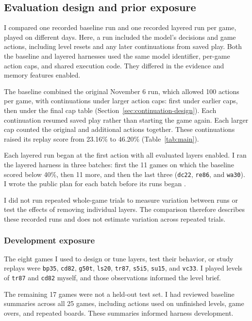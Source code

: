 \subsection{Evaluation design and prior exposure}\label{sec:design}
I compared one recorded baseline run and one recorded layered run per game, played on different days. Here, a run included the model's decisions and game actions, including level resets and any later continuations from saved play. Both the baseline and layered harnesses used the same model identifier, per-game action caps, and shared execution code. They differed in the evidence and memory features enabled.

The baseline combined the original November 6 run, which allowed 100 actions per game, with continuations under larger action caps: first under earlier caps, then under the final cap table (Section~\ref{sec:continuation-design}). Each continuation resumed saved play rather than starting the game again. Each larger cap counted the original and additional actions together. These continuations raised its replay score from 23.16\% to 46.20\% (Table~\ref{tab:main}).

Each layered run began at the first action with all evaluated layers enabled. I ran the layered harness in three batches: first the 11 games on which the baseline scored below 40\%, then 11 more, and then the last three (\texttt{dc22}, \texttt{re86}, and \texttt{wa30}). I wrote the public plan for each batch before its runs began \citep{dai2026layered}.

I did not run repeated whole-game trials to measure variation between runs or test the effects of removing individual layers. The comparison therefore describes these recorded runs and does not estimate variation across repeated trials.

\subsubsection{Development exposure}
The eight games I used to design or tune layers, test their behavior, or study replays were \texttt{bp35}, \texttt{cd82}, \texttt{g50t}, \texttt{ls20}, \texttt{tr87}, \texttt{s5i5}, \texttt{su15}, and \texttt{vc33}. I played levels of \texttt{tr87} and \texttt{cd82} myself, and those observations informed the level brief.

The remaining 17 games were not a held-out test set. I had reviewed baseline summaries across all 25 games, including actions used on unfinished levels, game overs, and repeated boards. These summaries informed harness development.

